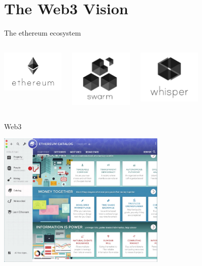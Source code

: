 \documentclass{beamer}
\begin{document}
\section[web3]{The Web3 Vision}
\begin{frame}{The ethereum ecosystem}
\begin{columns}[T]
  \includegraphics[width=3cm]{ethereum.jpg}
 
  \includegraphics[width=3cm]{swarm.jpg}

  \includegraphics[width=3cm]{whisper.jpg}
\end{columns}

 
\end{frame}

\begin{frame}{Web3}
\begin{center}

\includegraphics[width=8cm]{mistvision.png} 
 
\end{center}
\end{frame}



 
\end{document}
